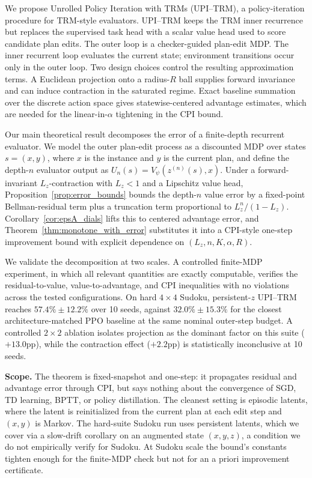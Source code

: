 \documentclass{article}
\theoremstyle{plain}
\theoremstyle{definition}
\theoremstyle{remark}
\begin{document}
We propose Unrolled Policy Iteration with TRMs (UPI--TRM), a policy-iteration procedure for TRM-style evaluators. UPI--TRM keeps the TRM inner recurrence but replaces the supervised task head with a scalar value head used to score candidate plan edits. The outer loop is a checker-guided plan-edit MDP. The inner recurrent loop evaluates the current state; environment transitions occur only in the outer loop. Two design choices control the resulting approximation terms. A Euclidean projection onto a radius-$R$ ball supplies forward invariance and can induce contraction in the saturated regime. Exact baseline summation over the discrete action space gives statewise-centered advantage estimates, which are needed for the linear-in-$\alpha$ tightening in the CPI bound.

Our main theoretical result decomposes the error of a finite-depth recurrent evaluator. We model the outer plan-edit process as a discounted MDP over states $s=(x,y)$, where $x$ is the instance and $y$ is the current plan, and define the depth-$n$ evaluator output as $U_n(s)=V_\psi(z^{(n)}(s),x)$. Under a forward-invariant $L_z$-contraction with $L_z<1$ and a Lipschitz value head, Proposition~\ref{prop:error_bounds} bounds the depth-$n$ value error by a fixed-point Bellman-residual term plus a truncation term proportional to $L_z^n/(1-L_z)$. Corollary~\ref{cor:epsA_dials} lifts this to centered advantage error, and Theorem~\ref{thm:monotone_with_error} substitutes it into a CPI-style one-step improvement bound with explicit dependence on $(L_z,n,K,\alpha,R)$.

We validate the decomposition at two scales. A controlled finite-MDP experiment, in which all relevant quantities are exactly computable, verifies the residual-to-value, value-to-advantage, and CPI inequalities with no violations across the tested configurations. On hard $4\times4$ Sudoku, persistent-$z$ UPI--TRM reaches $57.4\% \pm 12.2\%$ over 10 seeds, against $32.0\% \pm 15.3\%$ for the closest architecture-matched PPO baseline at the same nominal outer-step budget. A controlled $2\times 2$ ablation isolates projection as the dominant factor on this suite ($+13.0$pp), while the contraction effect ($+2.2$pp) is statistically inconclusive at 10 seeds.

\textbf{Scope.} The theorem is fixed-snapshot and one-step: it propagates residual and advantage error through CPI, but says nothing about the convergence of SGD, TD learning, BPTT, or policy distillation. The cleanest setting is episodic latents, where the latent is reinitialized from the current plan at each edit step and $(x,y)$ is Markov. The hard-suite Sudoku run uses persistent latents, which we cover via a slow-drift corollary on an augmented state $(x,y,z)$, a condition we do not empirically verify for Sudoku. At Sudoku scale the bound's constants tighten enough for the finite-MDP check but not for an a priori improvement certificate.
\end{document}

